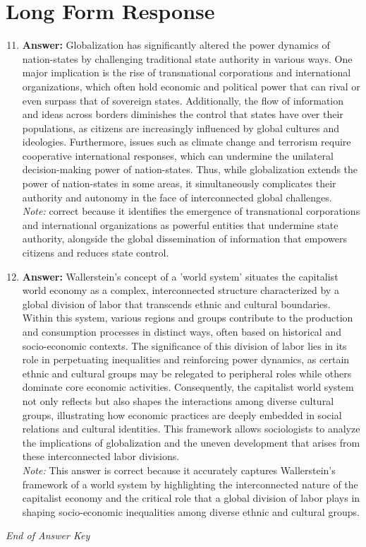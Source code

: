 \documentclass[12pt]{article}
\begin{document}
\section*{Long Form Response}
\begin{enumerate}[label=\arabic*.]
\setcounter{enumi}{10}
\item \textbf{Answer:} Globalization has significantly altered the power dynamics of nation-states by challenging traditional state authority in various ways. One major implication is the rise of transnational corporations and international organizations, which often hold economic and political power that can rival or even surpass that of sovereign states. Additionally, the flow of information and ideas across borders diminishes the control that states have over their populations, as citizens are increasingly influenced by global cultures and ideologies. Furthermore, issues such as climate change and terrorism require cooperative international responses, which can undermine the unilateral decision-making power of nation-states. Thus, while globalization extends the power of nation-states in some areas, it simultaneously complicates their authority and autonomy in the face of interconnected global challenges.
\\ \textit{Note:} correct because it identifies the emergence of transnational corporations and international organizations as powerful entities that undermine state authority, alongside the global dissemination of information that empowers citizens and reduces state control.
\item \textbf{Answer:} Wallerstein's concept of a 'world system' situates the capitalist world economy as a complex, interconnected structure characterized by a global division of labor that transcends ethnic and cultural boundaries. Within this system, various regions and groups contribute to the production and consumption processes in distinct ways, often based on historical and socio-economic contexts. The significance of this division of labor lies in its role in perpetuating inequalities and reinforcing power dynamics, as certain ethnic and cultural groups may be relegated to peripheral roles while others dominate core economic activities. Consequently, the capitalist world system not only reflects but also shapes the interactions among diverse cultural groups, illustrating how economic practices are deeply embedded in social relations and cultural identities. This framework allows sociologists to analyze the implications of globalization and the uneven development that arises from these interconnected labor divisions.
\\ \textit{Note:} This answer is correct because it accurately captures Wallerstein's framework of a world system by highlighting the interconnected nature of the capitalist economy and the critical role that a global division of labor plays in shaping socio-economic inequalities among diverse ethnic and cultural groups.
\end{enumerate}

\vfill
\noindent\textit{End of Answer Key}
\end{document}
